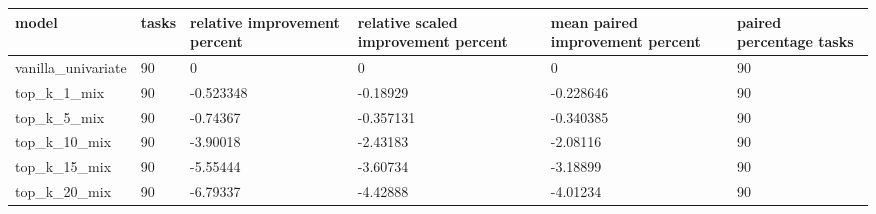 \begin{tabular}{llllll}
\toprule
model & tasks & relative improvement percent & relative scaled improvement percent & mean paired improvement percent & paired percentage tasks \\
\midrule
vanilla\_univariate & 90 & 0 & 0 & 0 & 90 \\
top\_k\_1\_mix & 90 & -0.523348 & -0.18929 & -0.228646 & 90 \\
top\_k\_5\_mix & 90 & -0.74367 & -0.357131 & -0.340385 & 90 \\
top\_k\_10\_mix & 90 & -3.90018 & -2.43183 & -2.08116 & 90 \\
top\_k\_15\_mix & 90 & -5.55444 & -3.60734 & -3.18899 & 90 \\
top\_k\_20\_mix & 90 & -6.79337 & -4.42888 & -4.01234 & 90 \\
\bottomrule
\end{tabular}
